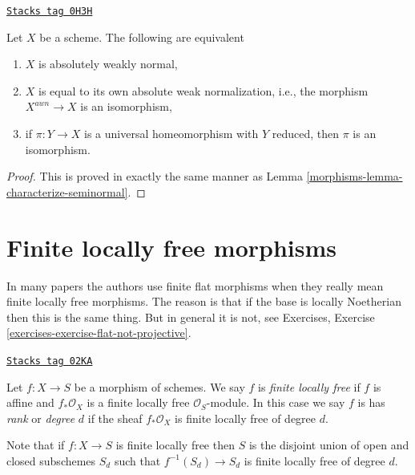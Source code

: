 \begin{lemma}
\label{morphisms-lemma-characterize-absolutely-weakly-normal}
\href{https://stacks.math.columbia.edu/tag/0H3H}{\texttt{Stacks tag 0H3H}}

Let $X$ be a scheme. The following are equivalent
\begin{enumerate}
\item $X$ is absolutely weakly normal,
\item $X$ is equal to its own absolute weak normalization, i.e., the morphism
$X^{awn} \to X$ is an isomorphism,
\item if $\pi : Y \to X$ is a universal homeomorphism with $Y$ reduced, then
$\pi$ is an isomorphism.
\end{enumerate}
\end{lemma}

\begin{proof}

This is proved in exactly the same manner as
Lemma \ref{morphisms-lemma-characterize-seminormal}.
\end{proof}

\section{Finite locally free morphisms}
\label{morphisms-section-finite-locally-free}
In many papers the authors use finite flat morphisms when they really mean
finite locally free morphisms. The reason is that if the base is locally
Noetherian then this is the same thing. But in general it is not, see
Exercises, Exercise \ref{exercises-exercise-flat-not-projective}.

\begin{definition}
\label{morphisms-definition-finite-locally-free}
\href{https://stacks.math.columbia.edu/tag/02KA}{\texttt{Stacks tag 02KA}}

Let $f : X \to S$ be a morphism of schemes.
We say $f$ is {\it finite locally free} if $f$ is
affine and $f_*\mathcal{O}_X$ is a finite locally
free $\mathcal{O}_S$-module. In this case we say $f$ is
has {\it rank} or {\it degree} $d$
if the sheaf $f_*\mathcal{O}_X$ is finite locally free of degree $d$.
\end{definition}

Note that if $f : X \to S$ is finite locally free then $S$ is the disjoint
union of open and closed subschemes $S_d$ such that $f^{-1}(S_d) \to S_d$
is finite locally free of degree $d$.

